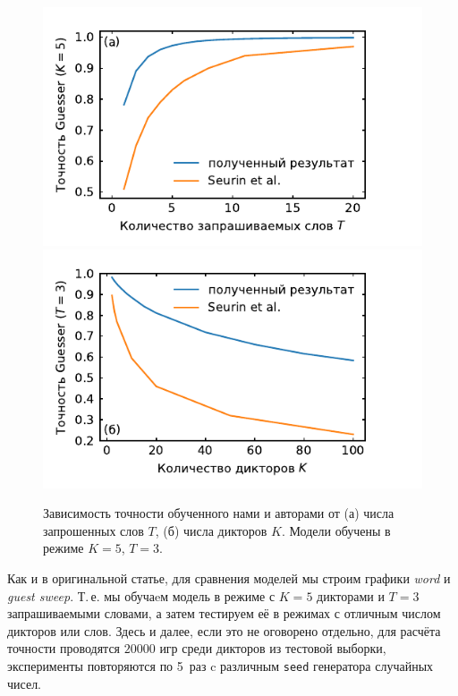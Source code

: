 \begin{figure}[!h]
    \centering
    \includegraphics[scale=\pltscale]{../plots/word_sweep.pdf}\\
    \includegraphics[scale=\pltscale]{../plots/guest_sweep.pdf}
    \caption{Зависимость точности \guesser{} обученного нами и авторами
    \citeisr{} от (а) числа запрошенных слов $T$, (б) числа дикторов $K$.
    Модели обучены в режиме $K = 5$, $T = 3$.}
    \label{fig:guesser_test}
\end{figure}

Как и в оригинальной статье, для сравнения моделей мы строим графики
\textit{word} и \textit{guest sweep}. Т.\,е. мы обучаeм модель в режиме с $K =
5$ дикторами и $T = 3$ запрашиваемыми словами, а затем тестируем её в режимах с
отличным числом дикторов или слов. Здесь и далее, если это не оговорено
отдельно, для расчёта точности проводятся $20000$ игр среди дикторов из тестовой
выборки, эксперименты повторяются по 5~раз c различным \texttt{seed} генератора
случайных чисел.

